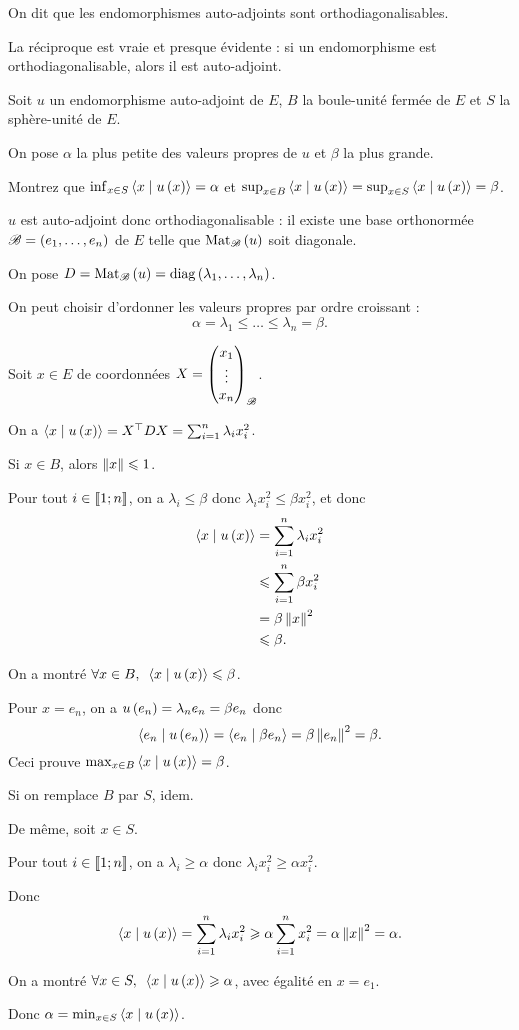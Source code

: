 On dit que les endomorphismes auto-adjoints sont orthodiagonalisables.

\begin{rem}
La réciproque est vraie et presque évidente : si un endomorphisme est orthodiagonalisable, alors il est auto-adjoint.
\end{rem}

\begin{exo}
Soit \(u\) un endomorphisme auto-adjoint de \(E\), \(B\) la boule-unité fermée de \(E\) et \(S\) la sphère-unité de \(E\).

On pose \(\alpha\) la plus petite des valeurs propres de \(u\) et \(\beta\) la plus grande.

Montrez que \(\inf_{x\in S}\ps{x}{u\paren{x}}=\alpha\) et \(\sup_{x\in B}\ps{x}{u\paren{x}}=\sup_{x\in S}\ps{x}{u\paren{x}}=\beta\).
\end{exo}

\begin{corr}
\(u\) est auto-adjoint donc orthodiagonalisable : il existe une base orthonormée \(\mathscr{B}=\left(e_1,\dots,e_n\right)\) de \(E\) telle que \(\Mat{u}\) soit diagonale.

On pose \(D=\Mat{u}=\diag{\lambda_1,\dots,\lambda_n}\).

On peut choisir d'ordonner les valeurs propres par ordre croissant : \[\alpha=\lambda_1\leq\dots\leq\lambda_n=\beta.\]

Soit \(x\in E\) de coordonnées \(X=\begin{pmatrix}x_1\\\vdots\\x_n\end{pmatrix}_{\mathscr{B}}\).

On a \(\ps{x}{u\paren{x}}=\trans{X}DX=\sum_{i=1}^n\lambda_ix_i^2\).

Si \(x\in B\), alors \(\norme{x}\leq1\).

Pour tout \(i\in\left\llbracket1;n\right\rrbracket\), on a \(\lambda_i\leq\beta\) donc \(\lambda_ix_i^2\leq\beta x_i^2\), et donc \[\begin{aligned}
\ps{x}{u\paren{x}}&=\sum_{i=1}^n\lambda_ix_i^2 \\
&\leq\sum_{i=1}^n\beta x_i^2 \\
&=\beta\norme{x}^2 \\
&\leq\beta.
\end{aligned}\]

On a montré \(\quantifs{\forall x\in B}\ps{x}{u\paren{x}}\leq\beta\).

Pour \(x=e_n\), on a \(u\left(e_n\right)=\lambda_ne_n=\beta e_n\) donc \[\ps{e_n}{u\paren{e_n}}=\ps{e_n}{\beta e_n}=\beta\norme{e_n}^2=\beta.\] Ceci prouve \(\max_{x\in B}\ps{x}{u\paren{x}}=\beta\).

Si on remplace \(B\) par \(S\), idem.

De même, soit \(x\in S\).

Pour tout \(i\in\left\llbracket1;n\right\rrbracket\), on a \(\lambda_i\geq\alpha\) donc \(\lambda_ix_i^2\geq\alpha x_i^2\).

Donc \[\ps{x}{u\paren{x}}=\sum_{i=1}^n\lambda_ix_i^2\geq\alpha\sum_{i=1}^nx_i^2=\alpha\norme{x}^2=\alpha.\]

On a montré \(\quantifs{\forall x\in S}\ps{x}{u\paren{x}}\geq\alpha\), avec égalité en \(x=e_1\).

Donc \(\alpha=\min_{x\in S}\ps{x}{u\paren{x}}\).
\end{corr}

